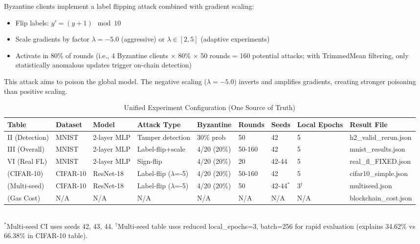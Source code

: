 \documentclass[12pt,a4paper,onecolumn]{article}
\begin{document}
Byzantine clients implement a label flipping attack combined with gradient scaling:
\begin{itemize}
    \item Flip labels: $y' = (y + 1) \mod 10$
    \item Scale gradients by factor $\lambda = -5.0$ (aggressive) or $\lambda \in [2, 5]$ (adaptive experiments)
    \item Activate in 80\% of rounds (i.e., 4 Byzantine clients $\times$ 80\% $\times$ 50 rounds = 160 potential attacks; with TrimmedMean filtering, only statistically anomalous updates trigger on-chain detection)
\end{itemize}

This attack aims to poison the global model. The negative scaling ($\lambda=-5.0$) inverts and amplifies gradients, creating stronger poisoning than positive scaling.

\begin{table}[t]
\caption{Unified Experiment Configuration (One Source of Truth)}
\label{tab:experiment_config}
\centering
\small
\begin{tabular}{p{1.8cm}p{1.5cm}p{1.2cm}p{2.3cm}p{1.5cm}p{1cm}p{1cm}p{1.5cm}p{2cm}}
\toprule
\textbf{Table} & \textbf{Dataset} & \textbf{Model} & \textbf{Attack Type} & \textbf{Byzantine} & \textbf{Rounds} & \textbf{Seeds} & \textbf{Local Epochs} & \textbf{Result File} \\
\midrule
II (Detection) & MNIST & 2-layer MLP & Tamper detection & 30\% prob & 50 & 42 & 5 & h2\_valid\_rerun.json \\
III (Overall) & MNIST & 2-layer MLP & Label-flip+scale & 4/20 (20\%) & 50-160 & 42 & 5 & mnist\_results.json \\
VI (Real FL) & MNIST & 2-layer MLP & Sign-flip & 4/20 (20\%) & 20 & 42-44 & 5 & real\_fl\_FIXED.json \\
(CIFAR-10) & CIFAR-10 & ResNet-18 & Label-flip ($\lambda$=-5) & 4/20 (20\%) & 50-160 & 42 & 5 & cifar10\_simple.json \\
(Multi-seed) & CIFAR-10 & ResNet-18 & Label-flip ($\lambda$=-5) & 4/20 (20\%) & 50 & 42-44$^*$ & 3$^\dagger$ & multiseed.json \\
(Gas Cost) & N/A & N/A & N/A & N/A & N/A & N/A & N/A & blockchain\_cost.json \\
\bottomrule
\end{tabular}
\\[0.1cm]
\small $^*$Multi-seed CI uses seeds 42, 43, 44. $^\dagger$Multi-seed table uses reduced local\_epochs=3, batch=256 for rapid evaluation (explains 34.62\% vs 66.38\% in CIFAR-10 table).
\end{table}
\end{document}

